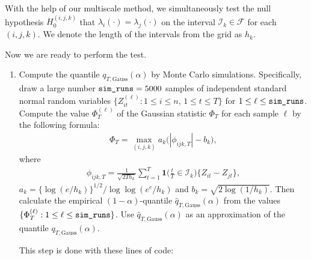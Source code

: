 \documentclass[a4paper]{article}
\begin{document}
With the help of our multiscale method, we simultaneously test the null hypothesis $H_0^{(i, j, k)}$ that $\lambda_i(\cdot) = \lambda_j(\cdot)$ on the interval $\mathcal{I}_k \in \mathcal{F}$ for each $(i, j, k)$. We denote the length of the intervals from the grid as $h_k$.

Now we are ready to perform the test.
\begin{enumerate}[label=\textit{Step \arabic*.}, leftmargin=1.45cm]
  \item Compute the quantile $q_{T,\text{Gauss}}(\alpha)$ by Monte Carlo simulations. Specifically, draw a large number $\verb|sim_runs| = 5000$ samples of independent standard normal random variables $\{Z_{it}^{(\ell)} : 1 \le i \le n, \, 1 \le t \le T \}$ for $1 \le \ell \le \verb|sim_runs|$. Compute the value $\Phi_T^{(\ell)}$ of the Gaussian statistic $\Phi_T$ for each sample $\ell$ by the following formula:
\begin{align*}
\Phi_T = \max_{(i,j,k)} a_k \big( |\phi_{ijk,T}| - b_k \big),
\end{align*}
where
\begin{align*}
\phi_{ijk,T} = \frac{1}{\sqrt{2Th_k}} \sum\limits_{t=1}^T \mathbf{1}\Big(\frac{t}{T} \in \mathcal{I}_k\Big) \big\{ Z_{it} - Z_{jt} \big\},
\end{align*}
$a_k = \{\log(e/h_k)\}^{1/2} / \log \log(e^e / h_k)$ and $b_k = \sqrt{2 \log(1/h_k)}$. Then calculate the empirical $(1-\alpha)$-quantile $\hat{q}_{T,\text{Gauss}}(\alpha)$ from the values $\{ \Phi_T^{(\ell)}: 1 \le \ell \le \verb|sim_runs| \}$. Use $\hat{q}_{T,\text{Gauss}}(\alpha)$ as an approximation of the quantile $q_{T,\text{Gauss}}(\alpha)$.

This step is done with these lines of code:


\end{enumerate}
\end{document}
